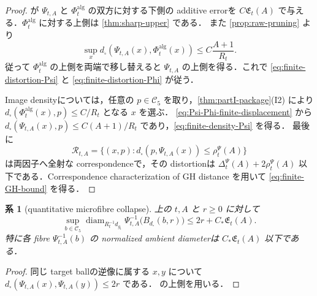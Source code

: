 \documentclass[a4paper,11pt]{ltjsarticle}
\numberwithin{equation}{section}
\theoremstyle{plain}
\newtheorem{corollary}[corollary]{系}
\theoremstyle{definition}
\theoremstyle{remark}
\newcommand{\cC}{\mathcal C}
\newcommand{\diam}{\operatorname{diam}}
\begin{document}
\begin{proof}
 が $\Psi_{t,A}$ と $\Phi_t^{\mathrm{alg}}$ の双方に対する下側の additive errorを
$C\mathfrak E_t(A)$ で与える．$\Phi_t^{\mathrm{alg}}$ に対する上側は \cref{thm:sharp-upper} である．
また \cref{prop:raw-pruning} より
\begin{equation}\label{eq:Psi-Phi-finite-displacement}
 \sup_x d_\square(\Psi_{t,A}(x),\Phi_t^{\mathrm{alg}}(x))
 \le C\frac{A+1}{R_t}.
\end{equation}
従って $\Phi_t^{\mathrm{alg}}$ の上側を両端で移し替えると $\Psi_{t,A}$ の上側を得る．これで
\eqref{eq:finite-distortion-Psi} と \eqref{eq:finite-distortion-Phi} が従う．

Image densityについては，任意の $p\in\cC_5$ を取り，\cref{thm:partI-package}(I2) により
$d_\square(\Phi_t^{\mathrm{alg}}(x),p)\le C/R_t$ となる $x$ を選ぶ．
\eqref{eq:Psi-Phi-finite-displacement} から
$d_\square(\Psi_{t,A}(x),p)\le C(A+1)/R_t$ であり，\eqref{eq:finite-density-Psi} を得る．
最後に
\[
 \mathscr R_{t,A}
 =\{(x,p):d_\square(p,\Psi_{t,A}(x))\le\rho_t^\Psi(A)\}
\]
は両因子へ全射な correspondenceで，その distortionは
$\Delta_t^\Psi(A)+2\rho_t^\Psi(A)$ 以下である．Correspondence characterization of GH distance
\cite[Chapter~7]{BBI} を用いて \eqref{eq:finite-GH-bound} を得る．
\end{proof}

\begin{corollary}[quantitative microfibre collapse]\label{cor:raw-microfibre-collapse}
上の $t,A$ と $r\ge0$ に対して
\begin{equation}\label{eq:microfibre-collapse}
 \sup_{b\in\cC_5}
 \diam_{R_t^{-1}d_{g_t}}
 \Psi_{t,A}^{-1}\bigl(B_{d_\square}(b,r)\bigr)
 \le 2r+C_*\mathfrak E_t(A).
\end{equation}
特に各 fibre $\Psi_{t,A}^{-1}(b)$ の normalized ambient diameterは $C_*\mathfrak E_t(A)$ 以下である．
\end{corollary}

\begin{proof}
同じ target ballの逆像に属する $x,y$ について
$d_\square(\Psi_{t,A}(x),\Psi_{t,A}(y))\le2r$ である．
 の上側を用いる．
\end{proof}
\end{document}
